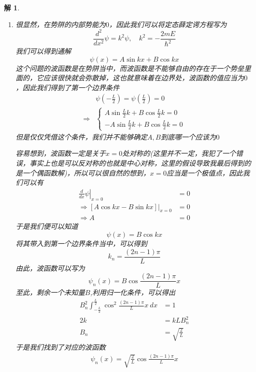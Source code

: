\documentclass{article}
\newtheorem{solution}{解}
\newcommand{\D}[2]{\frac{d}{d#2}#1}
\begin{document}
\begin{solution}
    \begin{enumerate}
        \item[(1)] 很显然，在势阱的内部势能为$0$，因此我们可以将定态薛定谔方程写为
    \begin{equation*}
        \frac{d^2}{dx^2}\psi=k^2\psi,\quad k^2=-\frac{2mE}{\hbar^2}
    \end{equation*}
    我们可以得到通解
    \begin{equation*}
        \psi(x)=A\sin{kx}+B\cos{kx}
    \end{equation*}
    这个问题的波函数是在势阱当中，而波函数是不能够自由的存在于一个势垒里面的，它应该很快就会弥散掉，这也就意味着在边界处，波函数的值应当为$0$，因此我们得到了第一个边界条件
    \begin{align*}
        &\psi(-\frac{L}{2})=\psi(\frac{L}{2})=0\\
        \Rightarrow&
        \begin{cases}
            A\sin{\frac{L}{2}k}+B\cos{\frac{L}{2}k}=0\\
            -A\sin{\frac{L}{2}k}+B\cos{\frac{L}{2}k}=0
        \end{cases}
    \end{align*}
    但是仅仅凭借这个条件，我们并不能够确定$A,B$到底哪一个应该为$0$

    容易想到，波函数一定是关于$x=0$处对称的(这里并不一定，我犯了一个错误，事实上也是可以反对称的也就是中心对称，这里的假设导致我最后得到的是一个偶函数解)，所以可以很自然的想到，$x=0$应当是一个极值点，因此我们可以有
    \begin{align*}
        \left.\D{\psi}{x}\right|_{x=0}&=0\\
        \Rightarrow\left.\left[A\cos{kx}-B\sin{kx}\right]\right|_{x=0}&=0\\
        \Rightarrow A&=0
    \end{align*}
    于是我们便可以知道
    \begin{equation*}
        \psi(x)=B\cos{kx}
    \end{equation*}
    将其带入到第一个边界条件当中，可以得到
    \begin{equation*}
        k_n=\frac{(2n-1)\pi}{L}
    \end{equation*}
    由此，波函数可以写为
    \begin{equation*}
        \psi_n(x)=B\cos{\frac{(2n-1)\pi}{L}x}
    \end{equation*}
    至此，剩余一个未知量$B$,利用归一化条件，可以得出
    \begin{align*}
        B_n^2\int_{-\frac{L}{2}}^{\frac{L}{2}}\cos^2{\frac{(2n-1)\pi}{L}x}\ dx&=1\\
        2k&=kLB_n^2\\
        B_n&=\sqrt{\frac{2}{L}}
    \end{align*}
    于是我们找到了对应的波函数
    \begin{align*}
        \psi_n(x)=\sqrt{\frac{2}{L}}\cos{\frac{(2n-1)\pi}{L}x}
    \end{align*}


\end{enumerate}
\end{solution}
\end{document}
